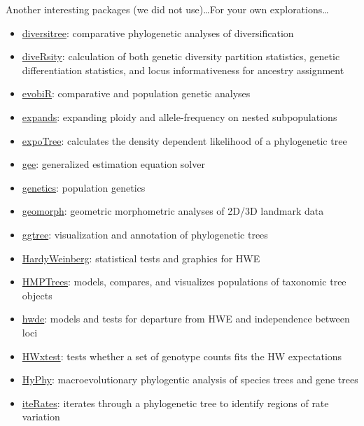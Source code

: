\documentclass[compress, ucs, xelatex, 11pt, xcolor=svgnames,
  hyperref={
    bookmarks=true,
    unicode=true,
    colorlinks=true,
    pdftitle={Molecular data in R},
    plainpages=false,
    pdfauthor={Vojtech Zeisek},
    pdfsubject={Course about phylogeny and evolution in R},
    pdfcreator={XeLaTeX},
    pdfkeywords={R, evolution, phylogeny, molecular data},
    linkcolor=Tomato,
    anchorcolor=SaddleBrown,
    citecolor=Goldenrod,
    filecolor=DarkMagenta,
    menucolor=Sienna,
    urlcolor=DarkTurquoise,
    pdftex},
  url={hyphens, lowtilde} %
  ]{beamer}
\begin{document}
\begin{frame}[allowframebreaks]{Another interesting packages (we did not use)\ldots}{For your own explorations\ldots}
\begin{itemize}
    \item \href{https://CRAN.R-project.org/package=diversitree}{diversitree}: comparative phylogenetic analyses of diversification
    \item \href{https://CRAN.R-project.org/package=diveRsity}{diveRsity}: calculation of both genetic diversity partition statistics, genetic differentiation statistics, and locus informativeness for ancestry assignment
    \item \href{https://CRAN.R-project.org/package=evobiR}{evobiR}: comparative and population genetic analyses
    \item \href{https://CRAN.R-project.org/package=expands}{expands}: expanding ploidy and allele-frequency on nested subpopulations
    \item \href{https://CRAN.R-project.org/package=expoTree}{expoTree}: calculates the density dependent likelihood of a phylogenetic tree
    \item \href{https://CRAN.R-project.org/package=gee}{gee}: generalized estimation equation solver
    \item \href{https://CRAN.R-project.org/package=genetics}{genetics}: population genetics
    \item \href{https://CRAN.R-project.org/package=geomorph}{geomorph}: geometric morphometric analyses of 2D/3D landmark data
    \item \href{https://www.bioconductor.org/packages/3.4/bioc/html/ggtree.html}{ggtree}: visualization and annotation of phylogenetic trees
    \item \href{https://CRAN.R-project.org/package=HardyWeinberg}{HardyWeinberg}: statistical tests and graphics for HWE
    \item \href{https://CRAN.R-project.org/package=HMPTrees}{HMPTrees}: models, compares, and visualizes populations of taxonomic tree objects
    \item \href{https://CRAN.R-project.org/package=hwde}{hwde}: models and tests for departure from HWE and independence between loci
    \item \href{https://CRAN.R-project.org/package=HWxtest}{HWxtest}: tests whether a set of genotype counts fits the HW expectations
    \item \href{https://CRAN.R-project.org/package=HyPhy}{HyPhy}: macroevolutionary phylogentic analysis of species trees and gene trees
    \item \href{https://CRAN.R-project.org/package=iteRates}{iteRates}: iterates through a phylogenetic tree to identify regions of rate variation

\end{itemize}
\end{frame}
\end{document}
